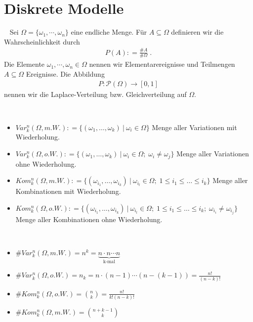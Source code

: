 
\section{Diskrete Modelle}

\begin{Definition}~
Sei $\Omega = \{ \omega_1, \cdots , \omega_n\}$ eine endliche Menge. Für $A \subseteq \Omega$ definieren wir die Wahrscheinlichkeit durch
\begin{align*}
P(A) : = \frac{\#A}{ \# \Omega} \; . 
\end{align*} 
Die Elemente $ \omega_1, \cdots , \omega_n \in \Omega$ nennen wir Elementarereignisse und Teilmengen $A \subseteq \Omega$ Ereignisse. Die Abbildung
\begin{align*}
P : \mathcal{P} (\Omega) \to [0,1]  
\end{align*}  
nennen wir die Laplace-Verteilung bzw. Gleichverteilung auf $\Omega$.
\end{Definition}


\begin{Definition}~
\begin{itemize}
\item $Var_k^n(\Omega, m.W.) : = \{ ( \omega_1, \ldots, \omega_k) \ |\  \omega_i \in \Omega \}$  Menge aller Variationen mit Wiederholung.
\item $Var_k^n(\Omega, o.W.) : = \{ ( \omega_1, \ldots, \omega_k) \ |\  \omega_i \in \Omega; \;  \omega_i \neq \omega_j  \}$  Menge aller Variationen ohne Wiederholung.
\item $Kom_k^n(\Omega, m.W.) : = \{ ( \omega_{i_1}, \ldots, \omega_{i_k})  \ |\  \omega_{i_l} \in \Omega; \; 1  \leq i_1 \leq  \ldots  \leq i_k  \}$  Menge aller Kombinationen  mit Wiederholung.
\item $Kom_k^n(\Omega, o.W.) : = \{ ( \omega_{i_1}, \ldots, \omega_{i_k} ) \ |\  \omega_{i_l} \in \Omega; \; 1 \leq i_1  \leq \ldots \leq i_k; \;  \omega_{i_i} \neq \omega_{i_j} \} $  Menge aller Kombinationen  ohne  Wiederholung.
\end{itemize}
\end{Definition}

\begin{Lemma}~
\begin{itemize}
\item $\# Var_k^n(\Omega, m.W.)  = n^k = \underbrace{n \cdot n \cdots n}_{\text{k-mal}}$
\item $\# Var_k^n(\Omega, o.W.)  = n_k = n \cdot (n-1) \cdots  (n-(k-1)) = \frac{n!}{(n-k)!}$  
\item $\#Kom_k^n(\Omega, o.W.) = \binom{n}{k} = \frac{n!}{k! (n-k)!}$  
\item $\#Kom_k^n(\Omega, m.W.)  = \binom{n + k -1}{k}$  
\end{itemize}
\end{Lemma}

